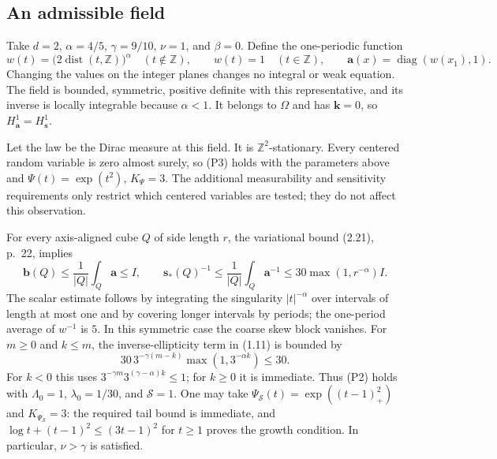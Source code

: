 \documentclass[10pt]{article}
\begin{document}
\subsection*{An admissible field}
Take \(d=2\), \(\alpha=4/5\), \(\gamma=9/10\), \(\nu=1\), and \(\beta=0\). Define the one-periodic function \[w(t)=\bigl(2\operatorname{dist}(t,\mathbb Z)\bigr)^\alpha\quad(t\notin\mathbb Z),
 \qquad w(t)=1\quad(t\in\mathbb Z),
 \qquad
 \mathbf a(x)=\operatorname{diag}(w(x_1),1).\] Changing the values on the integer planes changes no integral or weak equation. The field is bounded, symmetric, positive definite with this representative, and its inverse is locally integrable because \(\alpha<1\). It belongs to \(\Omega\) and has \(\mathbf k=0\), so \(H^1_{\mathbf a}=H^1_{\mathbf s}\).\par
Let the law be the Dirac measure at this field. It is \(\mathbb Z^2\)-stationary. Every centered random variable is zero almost surely, so (P3) holds with the parameters above and \(\Psi(t)=\exp(t^2)\), \(K_\Psi=3\). The additional measurability and sensitivity requirements only restrict which centered variables are tested; they do not affect this observation.\par
For every axis-aligned cube \(Q\) of side length \(r\), the variational bound (2.21), p. 22, implies \[\mathbf b(Q)\le \frac1{|Q|}\int_Q\mathbf a\le I,\qquad
 \mathbf s_*(Q)^{-1}\le\frac1{|Q|}\int_Q\mathbf a^{-1}
 \le 30\max(1,r^{-\alpha})I.\] The scalar estimate follows by integrating the singularity \(|t|^{-\alpha}\) over intervals of length at most one and by covering longer intervals by periods; the one-period average of \(w^{-1}\) is \(5\). In this symmetric case the coarse skew block vanishes. For \(m\ge0\) and \(k\le m\), the inverse-ellipticity term in (1.11) is bounded by \[30\,3^{-\gamma(m-k)}\max(1,3^{-\alpha k})\le30.\] For \(k<0\) this uses \(3^{-\gamma m}3^{(\gamma-\alpha)k}\le1\); for \(k\ge0\) it is immediate. Thus (P2) holds with \(\Lambda_0=1\), \(\lambda_0=1/30\), and \(\mathcal S=1\). One may take \(\Psi_{\mathcal S}(t)=\exp((t-1)_+^2)\) and \(K_{\Psi_{\mathcal S}}=3\): the required tail bound is immediate, and \(\log t+(t-1)^2\le(3t-1)^2\) for \(t\ge1\) proves the growth condition. In particular, \(\nu>\gamma\) is satisfied.\par
\end{document}
